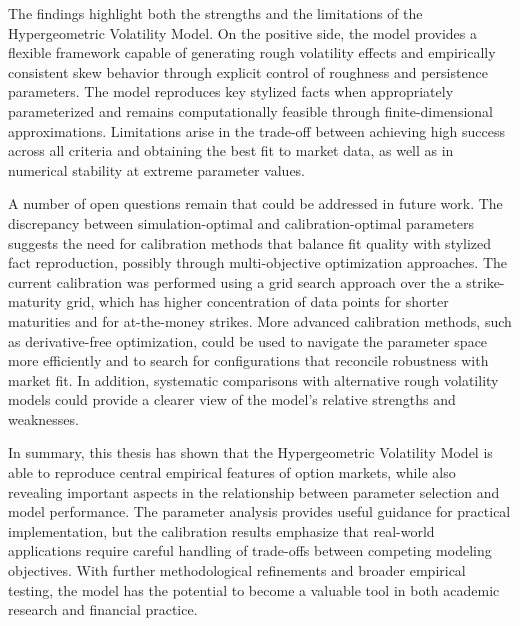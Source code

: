 The findings highlight both the strengths and the limitations of the Hypergeometric Volatility Model. On the positive side, the model provides a flexible framework capable of generating rough volatility effects and empirically consistent skew behavior through explicit control of roughness and persistence parameters. The model reproduces key stylized facts when appropriately parameterized and remains computationally feasible through finite-dimensional approximations. Limitations arise in the trade-off between achieving high success across all criteria and obtaining the best fit to market data, as well as in numerical stability at extreme parameter values.

A number of open questions remain that could be addressed in future work. The discrepancy between simulation-optimal and calibration-optimal parameters suggests the need for calibration methods that balance fit quality with stylized fact reproduction, possibly through multi-objective optimization approaches. The current calibration was performed using a grid search approach over the a strike-maturity grid, which has higher concentration of data points for shorter maturities and for at-the-money strikes. More advanced calibration methods, such as derivative-free optimization, could be used to navigate the parameter space more efficiently and to search for configurations that reconcile robustness with market fit. In addition, systematic comparisons with alternative rough volatility models could provide a clearer view of the model's relative strengths and weaknesses.

In summary, this thesis has shown that the Hypergeometric Volatility Model is able to reproduce central empirical features of option markets, while also revealing important aspects in the relationship between parameter selection and model performance. The parameter analysis provides useful guidance for practical implementation, but the calibration results emphasize that real-world applications require careful handling of trade-offs between competing modeling objectives. With further methodological refinements and broader empirical testing, the model has the potential to become a valuable tool in both academic research and financial practice.